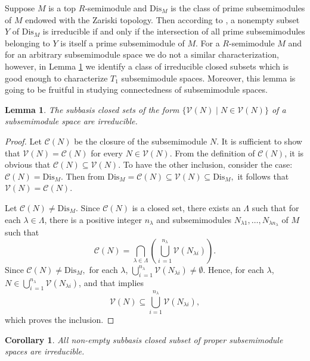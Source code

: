 \documentclass[12pt,english]{smfart}
\newtheorem{lemma}[theorem]{Lemma}
\newtheorem{corollary}[theorem]{Corollary}
\theoremstyle{definition}
\begin{document}
Suppose $M$ is a top $R$-semimodule and $\mathrm{Dis}_M$ is the class of prime subsemimodules of $M$ endowed with the Zariski topology. Then according to \cite[Theorem 3.3]{HPH21}, a nonempty subset $Y$ of $\mathrm{Dis}_M$ is irreducible if and only if  the intersection of all prime subsemimodules belonging to $Y$ is itself a prime subsemimodule of $M$. For a $R$-semimodule $M$ and for an arbitrary subsemimodule space we do not a similar characterization, however, in Lemma \ref{irrc} we identify a class of irreducible closed subsets which is good enough to characterize $T_1$ subsemimodule spaces. Moreover, this lemma is going to be fruitful in studying connectedness of subsemimodule spaces.

\begin{lemma}\label{irrc}
The subbasis closed sets of the form $\{\mathcal{V}(N)\mid N\in \mathcal{V}(N)\}$ of a subsemimodule space are irreducible. 
\end{lemma} 

\begin{proof} 
Let $\mathcal{C}(N)$ be the closure of the subsemimodule $N$. It is sufficient to show that $\mathcal{V}(N)=\mathcal{C}(N)$ for every $N\in\mathcal{V}(N)$. From the definition of  $\mathcal{C}(N)$, it is obvious that $\mathcal{C}(N)\subseteq \mathcal{V}(N)$. 
To have the other inclusion, consider the case: $\mathcal{C}(N)= \mathrm{Dis}_M$. Then  from 
$
\mathrm{Dis}_M=\mathcal{C}(N)\subseteq \mathcal{V}(N)\subseteq \mathrm{Dis}_M,
$
it follows that $\mathcal{V}(N)=\mathcal{C}(N)$. 

Let $\mathcal{C}(N)\neq \mathrm{Dis}_M$. Since $\mathcal{C}(N)$ is a closed set, there exists an $\Lambda$ such that  for each $\lambda\in\Lambda$, there is a positive integer $n_{\lambda}$ and subsemimodules $N_{\lambda 1},\dots, N_{\lambda n_\lambda}$ of $M$ such that 
\[
\mathcal{C}(N)={\bigcap_{\lambda\in\Lambda}}\left({\bigcup_{ i\,=1}^{ n_\lambda}}\mathcal{V}(N_{\lambda i})\right).
\]
Since
$\mathcal{C}(N)\neq \mathrm{Dis}_M,$  for each $\lambda$, ${\bigcup_{ i\,=1}^{ n_\lambda}}\mathcal{V}(N_{\lambda i})\neq \emptyset$. Hence, for each $\lambda$, $N\in   {\bigcup_{ i\,=1}^{ n_\lambda}}\mathcal{V}(N_{\lambda i})$, and that implies \[\mathcal{V}(N)\subseteq {\bigcup_{ i=1}^{ n_\lambda}}\mathcal{V}(N_{\lambda i}),\] which proves the inclusion.	
\end{proof}     

\begin{corollary}\label{spiir}
All non-empty subbasis closed subset of proper subsemimodule spaces are irreducible.
\end{corollary} 
\end{document}
